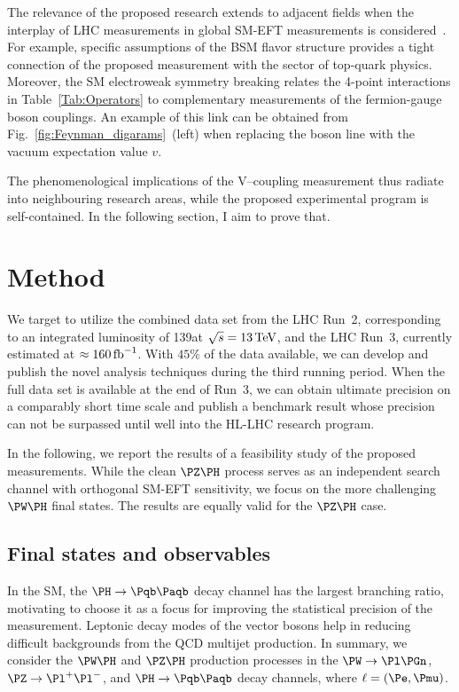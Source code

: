 \documentclass[a4paper,11pt]{article}
\newcommand{\Pb}{{{\Pqb}}\xspace}
\newcommand{\PAb}{{{{\Paqb}}}\xspace}
\renewcommand{\PV}{{{{V}}}\xspace}
\begin{document}
The relevance of the proposed research extends to adjacent fields when the interplay of LHC measurements in global SM-EFT measurements is considered~\cite{Ellis:2018gqa,Ethier:2021bye}.
For example, specific assumptions of the BSM flavor structure provides a tight connection of the proposed measurement with the sector of top-quark physics. 
Moreover, the SM electroweak symmetry breaking relates the 4-point interactions in Table~\ref{Tab:Operators} to complementary measurements of the fermion-gauge boson couplings. 
An example of this link can be obtained from Fig.~\ref{fig:Feynman_digarams}~(left) when replacing the \PH boson line with the vacuum expectation value $v$.

The phenomenological implications of the \PV--\PH coupling measurement thus radiate into neighbouring research areas, while the proposed experimental program is self-contained.
In the following section, I aim to prove that. 

\section{Method}
\label{sec:method}

We target to utilize the combined data set from the LHC Run~2, corresponding to an integrated luminosity of 139\fbinv at $\sqrt{s}=13\,\text{Te\hspace{-.08em}V}$, and the LHC Run~3, currently estimated at $\approx160\mbox{\ensuremath{\,\text{fb}^{-1}}}$.
With $45\%$ of the data available, we can develop and publish the novel analysis techniques during the third running period. 
When the full data set is available at the end of Run~3, we can obtain ultimate precision on a comparably short time scale and publish a benchmark result whose precision can not be surpassed until well into the HL-LHC research program.

In the following, we report the results of a feasibility study of the proposed measurements.
While the clean $\PZ\PH$ process serves as an independent search channel with orthogonal SM-EFT sensitivity, we focus on the more challenging $\PW\PH$ final states.
The results are equally valid for the $\PZ\PH$ case.

\subsection{Final states and observables}

In the SM, the $\PH \to \Pb \PAb$ decay channel has the largest branching ratio, motivating to choose it as a focus for improving  the statistical precision of the measurement.
Leptonic decay modes of the vector bosons help in reducing difficult backgrounds from the QCD multijet production.
In summary, we consider the $\PW\PH$ and $\PZ\PH$ production processes in the $\PW\to \Pl \Pgn$, $\PZ\to {\Pl}^{+} {\Pl}^{-}$, and $\PH \to \Pb \PAb $ decay channels, where $\ell=(\Pe, \Pmu)$.
\end{document}
